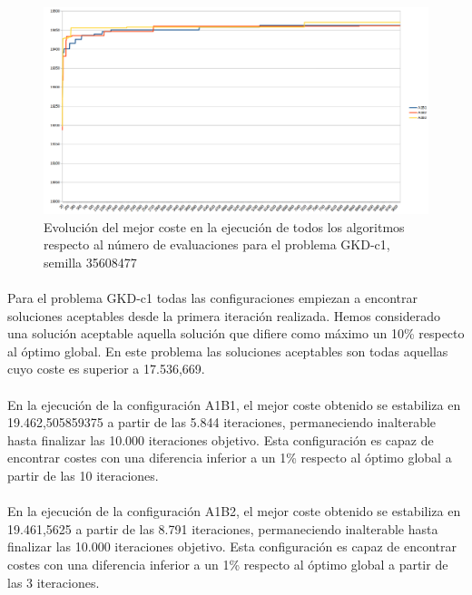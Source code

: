 	\begin{figure}[H]
		\centering
		\includegraphics[scale=0.3]{img/GKD1conver.png}
		\caption{Evolución del mejor coste en la ejecución de todos los algoritmos respecto al número de evaluaciones para el problema GKD-c1, semilla 35608477}
		\label{gkd-c1_historico}
	\end{figure}

	\paragraph{}Para el problema GKD-c1 todas las configuraciones empiezan a encontrar soluciones aceptables desde la primera iteración realizada. Hemos considerado una solución aceptable aquella solución que difiere como máximo un 10\% respecto al óptimo global. En este problema las soluciones aceptables son todas aquellas cuyo coste es superior a 17.536,669.
	
	\paragraph{}En la ejecución de la configuración A1B1, el mejor coste obtenido se estabiliza en 19.462,505859375 a partir de las 5.844 iteraciones, permaneciendo inalterable hasta finalizar las 10.000 iteraciones objetivo. Esta configuración es capaz de encontrar costes con una diferencia inferior a un 1\% respecto al óptimo global a partir de las 10 iteraciones.
	
	\paragraph{}En la ejecución de la configuración A1B2, el mejor coste obtenido se estabiliza en 19.461,5625 a partir de las 8.791 iteraciones, permaneciendo inalterable hasta finalizar las 10.000 iteraciones objetivo. Esta configuración es capaz de encontrar costes con una diferencia inferior a un 1\% respecto al óptimo global a partir de las 3 iteraciones.
	
